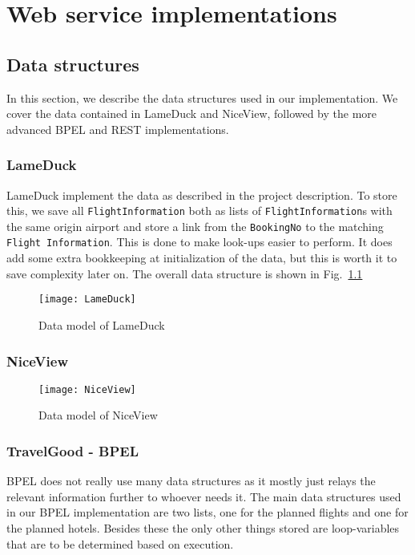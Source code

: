 {\setlength{\chapterfontsize}{23pt}
\chapter{Web service implementations}
}

\section{Data structures}
In this section, we describe the data structures used in our implementation. We cover the data contained in LameDuck and NiceView, followed by the more advanced BPEL and REST implementations.

\subsection{LameDuck}
LameDuck implement the data as described in the project description. To store this, we save all \texttt{FlightInformation} both as lists of \texttt{FlightInformation}s with the same origin airport and store a link from the \texttt{BookingNo} to the matching \texttt{Flight Information}. This is done to make look-ups easier to perform. It does add some extra bookkeeping at initialization of the data, but this is worth it to save complexity later on. The overall data structure is shown in Fig.~\ref{fig:lameduck_class}

\begin{figure}[H]
\centering
\texttt{[image: LameDuck]}
\caption{Data model of LameDuck}
\label{fig:lameduck_class}
\end{figure}


\subsection{NiceView}
\begin{figure}[H]
\centering
\texttt{[image: NiceView]}
\caption{Data model of NiceView}
\label{fig:niceview_class}
\end{figure}

\subsection{TravelGood - BPEL}
BPEL does not really use many data structures as it mostly just relays the relevant information further to whoever needs it. The main data structures used in our BPEL implementation are two lists, one for the planned flights and one for the planned hotels. Besides these the only other things stored are loop-variables that are to be determined based on execution.

